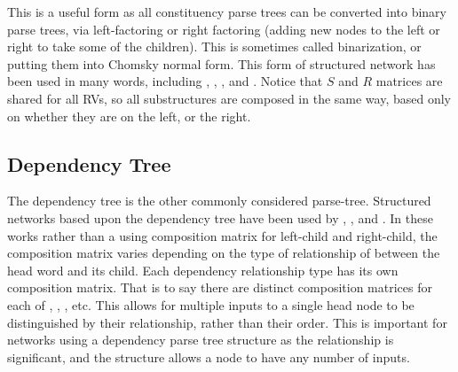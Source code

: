 \documentclass[12pt,parskip]{komatufte}
\begin{document}
This is a useful form as all constituency parse trees can be converted into binary parse trees, via left-factoring or right factoring (adding new nodes to the left or right to take some of the children).
This is sometimes called binarization, or putting them into  Chomsky normal form.
This form of structured network has been used in many words, including , \textcite{SocherEtAl2011:RAE},  \textcite{SocherEtAl2011:PoolRAE},
 \textcite{Socher2011ParsingPhrases} and \textcite{zhang2014BRAE}.
Notice that $S$ and $R$ matrices are shared for all RVs, so all substructures are composed in the same way, based only on whether they are on the left, or the right.

\subsection{Dependency Tree}\label{sec:dependency-tree}
The dependency tree is the other commonly considered parse-tree.
Structured networks based upon the dependency tree have been used by , , and .
In these works rather than a using composition matrix for left-child and right-child,
the composition matrix varies depending on the type of relationship of between the head word and its child.
Each dependency relationship type has its own composition matrix.
That is to say there are distinct composition matrices for each of
, , ,  etc.
This allows for multiple inputs to a single head node to be distinguished by their relationship, rather than their order.
This is important for networks using a dependency parse tree structure as the relationship is significant, and the structure allows a node to have any number of inputs.

\end{document}
